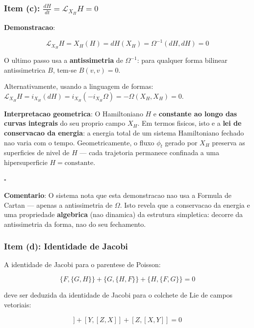 \documentclass[5p]{elsarticle}
\begin{document}
\subsubsection*{Item (c): $\frac{dH}{dt} = \mathcal{L}_{X_H}H = 0$}

\textbf{Demonstracao}:

\begin{equation}
\mathcal{L}_{X_H}H = X_H(H) = dH(X_H) = \Omega^{-1}(dH, dH) = 0
\end{equation}

O ultimo passo usa a \textbf{antissimetria} de $\Omega^{-1}$: para
qualquer forma bilinear antissimetrica $B$, tem-se $B(v,v) = 0$.

Alternativamente, usando a linguagem de formas:
$\mathcal{L}_{X_H}H = i_{X_H}(dH) = i_{X_H}(-i_{X_H}\Omega)
= -\Omega(X_H, X_H) = 0$.

\textbf{Interpretacao geometrica}: O Hamiltoniano $H$ e \textbf{constante
ao longo das curvas integrais} do seu proprio campo $X_H$. Em termos
fisicos, isto e a \textbf{lei de conservacao da energia}: a energia
total de um sistema Hamiltoniano fechado nao varia com o tempo.
Geometricamente, o fluxo $\phi_t$ gerado por $X_H$ preserva as
superficies de nivel de $H$ --- cada trajetoria permanece confinada
a uma hipersuperficie $H = \text{constante}$.

$\square$

\textbf{Comentario}: O sistema nota que esta demonstracao nao usa a
Formula de Cartan --- apenas a antissimetria de $\Omega$. Isto revela
que a conservacao da energia e uma propriedade \textbf{algebrica}
(nao dinamica) da estrutura simpletica: decorre da antissimetria da
forma, nao do seu fechamento.

\subsubsection*{Item (d): Identidade de Jacobi}

A identidade de Jacobi para o parentese de Poisson:

\begin{equation}
\{F,\{G,H\}\} + \{G,\{H,F\}\} + \{H,\{F,G\}\} = 0
\label{eq:jacobi}
\end{equation}

deve ser deduzida da identidade de Jacobi para o colchete de Lie de
campos vetoriais:

\begin{equation}
[X, [Y, Z]] + [Y, [Z, X]] + [Z, [X, Y]] = 0
\label{eq:jacobilie}
\end{equation}
\end{document}
